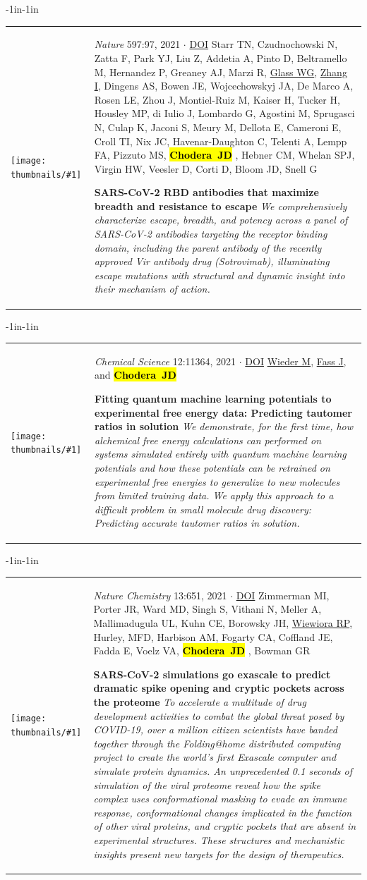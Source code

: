 \documentclass[10pt]{article}
\newcommand{\newarticle}[7]{
\begin{adjustwidth}{-1in}{-1in}  
\begin{tabular}{p{0.9in}p{7in}}
\parbox[c]{0.9in}{\texttt{[image: thumbnails/\#1]}} & \parbox[c]{6in}{\setstretch{0.9} {\small #4} $\cdot$ \href{#6}{#5} \\ {\footnotesize {#2}} \\ \raggedright { \bf\nohyphens{#3}}  \\ {\footnotesize\emph {#7}}} %
\end{tabular}
\end{adjustwidth}
\vspace{0.2in}
}
\newcommand{\jdc}{ {\bf \hl{Chodera~JD}} } %
\begin{document}
\newarticle{vir-antibodies-escape}{Starr TN, Czudnochowski N, Zatta F, Park YJ, Liu Z, Addetia A, Pinto D, Beltramello M, Hernandez P, Greaney AJ, Marzi R, \underline{Glass WG}, \underline{Zhang I}, Dingens AS, Bowen JE, Wojcechowskyj JA, De Marco A, Rosen LE, Zhou J, Montiel-Ruiz M, Kaiser H, Tucker H, Housley MP, di Iulio J, Lombardo G, Agostini M, Sprugasci N, Culap K, Jaconi S, Meury M, Dellota E, Cameroni E, Croll TI, Nix JC, Havenar-Daughton C, Telenti A, Lempp FA, Pizzuto MS, \jdc, Hebner CM, Whelan SPJ, Virgin HW, Veesler D, Corti D, Bloom JD, Snell G}{SARS-CoV-2 RBD antibodies that maximize breadth and resistance to escape}{\emph{Nature} 597:97, 2021}{DOI}{https://doi.org/10.1038/s41586-021-03807-6}{We comprehensively characterize escape, breadth, and potency across a panel of SARS-CoV-2 antibodies targeting the receptor binding domain, including the parent antibody of the recently approved Vir antibody drug (Sotrovimab), illuminating escape mutations with structural and dynamic insight into their mechanism of action.}

\newarticle{neutromeratio-vacuum.jpg}{\underline{Wieder M}, \underline{Fass J}, and \jdc}{Fitting quantum machine learning potentials to experimental free energy data: Predicting tautomer ratios in solution}{\emph{Chemical Science} 12:11364, 2021}{DOI}{http://doi.org/10.1039/D1SC01185E}{We demonstrate, for the first time, how alchemical free energy calculations can performed on systems simulated entirely with quantum machine learning potentials and how these potentials can be retrained on experimental free energies to generalize to new molecules from limited training data. We apply this approach to a difficult problem in small molecule drug discovery: Predicting accurate tautomer ratios in solution.}

\newarticle{foldingathome-covid-cryptic-pockets.jpg}{Zimmerman MI, Porter JR, Ward MD, Singh S, Vithani N, Meller A, Mallimadugula UL, Kuhn CE, Borowsky JH, \underline{Wiewiora RP}, Hurley, MFD, Harbison AM, Fogarty CA, Coffland JE, Fadda E, Voelz VA, \jdc, Bowman GR}{SARS-CoV-2 simulations go exascale to predict dramatic spike opening and cryptic pockets across the proteome}{\emph{Nature Chemistry} 13:651, 2021}{DOI}{https://doi.org/10.1038/s41557-021-00707-0}{To accelerate a multitude of drug development activities to combat the global threat posed by COVID-19, over a million citizen scientists have banded together through the Folding@home distributed computing project to create the world’s first Exascale computer and simulate protein dynamics. An unprecedented 0.1 seconds of simulation of the viral proteome reveal how the spike complex uses conformational masking to evade an immune response, conformational changes implicated in the function of other viral proteins, and cryptic pockets that are absent in experimental structures. These structures and mechanistic insights present new targets for the design of therapeutics.}
\end{document}
